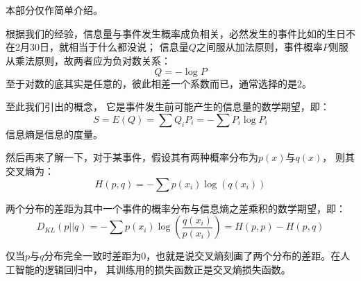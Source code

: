     \section[信息]{}
        本部分仅作简单介绍。
        
        根据我们的经验，信息量与事件发生概率成负相关，必然发生的事件比如\dove 的生日不在2月30日，就相当于什么都没说；
        信息量$Q$之间服从加法原则，事件概率$P$则服从乘法原则，故两者应为负对数关系：
        \begin{equation}
            Q = - \log P
            \nonumber
        \end{equation}
        至于对数的底其实是任意的，彼此相差一个系数而已，通常选择的是$2$。

        至此我们引出的概念，
        它是事件发生前可能产生的信息量的数学期望，即：
        \begin{equation}
            S = E(Q) = \sum Q_{i}P_{i} = -\sum P_{i}\log P_{i}
            \nonumber
        \end{equation}
        信息熵是信息的度量。

        然后再来了解一下，对于某事件，假设其有两种概率分布为$p(x)$与$q(x)$，
        则其交叉熵为：
        \begin{equation}
            H(p,q) = - \sum p({x_{i}})\log(q({x_{i}}))
            \nonumber
        \end{equation}

        两个分布的差距为其中一个事件的概率分布与信息熵之差乘积的数学期望，即：
        \begin{equation}
            D_{KL}(p||q) = - \sum p({x_{i}})\log(\frac{q({x_{i}})}{p({x_{i}})}) = H(p,p)-H(p,q)
            \nonumber
        \end{equation} 

        仅当$p$与$q$分布完全一致时差距为0，也就是说交叉熵刻画了两个分布的差距。在人工智能的逻辑回归中，
        其训练用的损失函数正是交叉熵损失函数。
%
